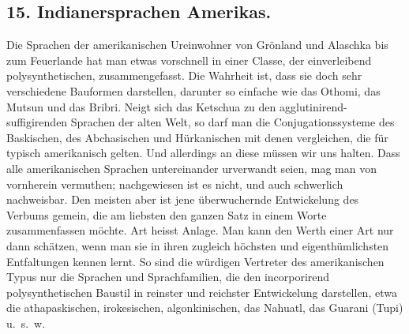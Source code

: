 \subsection*{15. Indianersprachen Amerikas.}\label{IV.IV.15}

Die Sprachen der amerikanischen Ureinwohner von Grönland und Alaschka bis zum Feuerlande hat man etwas vorschnell in einer Classe, \label{fp.402} der einverleibend polysynthetischen, zusammengefasst. Die Wahrheit ist, dass sie doch sehr verschiedene Bauformen darstellen, darunter so einfache wie das Othomi,  das Mutsun und das Bribri. Neigt sich das Ketschua zu den agglutinirend-suffigirenden Sprachen der alten Welt, so darf man die Conjugationssysteme des Baskischen, des Abchasischen und Hürkanischen mit denen vergleichen, die für typisch amerikanisch gelten. Und allerdings an diese müssen wir uns halten. Dass alle amerikanischen Sprachen untereinander urverwandt seien, mag man von vornherein vermuthen; nachgewiesen ist es nicht, und auch schwerlich nachweisbar. Den meisten aber ist jene überwuchernde Entwickelung des Verbums gemein, die am liebsten den ganzen Satz in einem Worte zusammenfassen möchte.  Art heisst Anlage. Man kann den Werth einer Art nur dann schätzen, wenn man sie in ihren zugleich höchsten und eigenthümlichsten Entfaltungen kennen lernt. So sind die würdigen Vertreter des amerikanischen Typus nur die Sprachen und Sprachfamilien, die den incorporirend polysynthetischen Baustil in reinster und reichster Entwickelung darstellen, etwa die athapaskischen, irokesischen, algonkinischen, das Nahuatl, das Guarani (Tupi) u.~s.~w.

